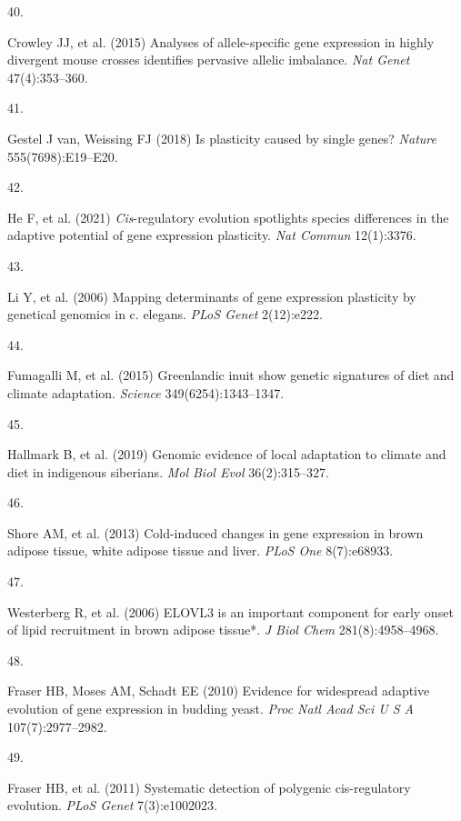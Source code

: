 \documentclass[9pt,twocolumn,twoside,lineno]{pnas-new}
\newlength{\cslhangindent}
\newlength{\csllabelwidth}
\newlength{\cslentryspacingunit} %
\newenvironment{CSLReferences}[2] %
 {%
  \setlength{\parindent}{0pt}
  \ifodd #1
  \let\oldpar\par
  \def\par{\hangindent=\cslhangindent\oldpar}
  \fi
  \setlength{\parskip}{#2\cslentryspacingunit}
 }%
 {}
\newcommand{\CSLLeftMargin}[1]{\parbox[t]{\csllabelwidth}{#1}}
\newcommand{\CSLRightInline}[1]{\parbox[t]{\linewidth - \csllabelwidth}{#1}\break}
\begin{document}
\begin{CSLReferences}{0}{0}
\leavevmode{}%
\CSLLeftMargin{40. }%
\CSLRightInline{Crowley JJ, et al. (2015) Analyses of allele-specific
gene expression in highly divergent mouse crosses identifies pervasive
allelic imbalance. \emph{Nat Genet} 47(4):353--360.}

\leavevmode{}%
\CSLLeftMargin{41. }%
\CSLRightInline{Gestel J van, Weissing FJ (2018) Is plasticity caused by
single genes? \emph{Nature} 555(7698):E19--E20.}

\leavevmode{}%
\CSLLeftMargin{42. }%
\CSLRightInline{He F, et al. (2021) \emph{Cis}-regulatory evolution
spotlights species differences in the adaptive potential of gene
expression plasticity. \emph{Nat Commun} 12(1):3376.}

\leavevmode{}%
\CSLLeftMargin{43. }%
\CSLRightInline{Li Y, et al. (2006) Mapping determinants of gene
expression plasticity by genetical genomics in c. elegans. \emph{PLoS
Genet} 2(12):e222.}

\leavevmode{}%
\CSLLeftMargin{44. }%
\CSLRightInline{Fumagalli M, et al. (2015) Greenlandic inuit show
genetic signatures of diet and climate adaptation. \emph{Science}
349(6254):1343--1347.}

\leavevmode{}%
\CSLLeftMargin{45. }%
\CSLRightInline{Hallmark B, et al. (2019) Genomic evidence of local
adaptation to climate and diet in indigenous siberians. \emph{Mol Biol
Evol} 36(2):315--327.}

\leavevmode{}%
\CSLLeftMargin{46. }%
\CSLRightInline{Shore AM, et al. (2013) Cold-induced changes in gene
expression in brown adipose tissue, white adipose tissue and liver.
\emph{PLoS One} 8(7):e68933.}

\leavevmode{}%
\CSLLeftMargin{47. }%
\CSLRightInline{Westerberg R, et al. (2006) {ELOVL3} is an important
component for early onset of lipid recruitment in brown adipose tissue*.
\emph{J Biol Chem} 281(8):4958--4968.}

\leavevmode{}%
\CSLLeftMargin{48. }%
\CSLRightInline{Fraser HB, Moses AM, Schadt EE (2010) Evidence for
widespread adaptive evolution of gene expression in budding yeast.
\emph{Proc Natl Acad Sci U S A} 107(7):2977--2982.}

\leavevmode{}%
\CSLLeftMargin{49. }%
\CSLRightInline{Fraser HB, et al. (2011) Systematic detection of
polygenic cis-regulatory evolution. \emph{PLoS Genet} 7(3):e1002023.}


\end{CSLReferences}
\end{document}
